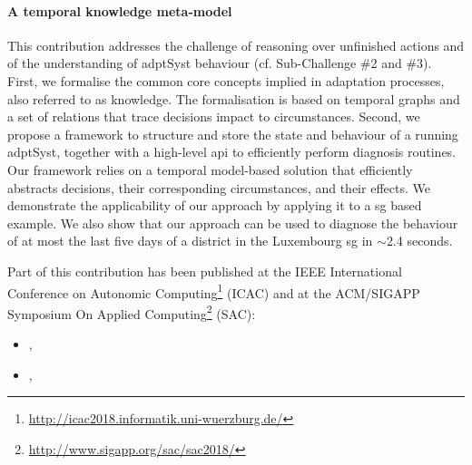 \paragraph{A temporal knowledge meta-model}
This contribution addresses the challenge of reasoning over unfinished actions and of the understanding of \gls{adptSyst} \gls{behaviour} (cf. Sub-Challenge \#2 and \#3).
First, we formalise the common core concepts implied in adaptation processes, also referred to as \gls{knowledge}.
The formalisation is based on temporal graphs and a set of relations that trace decisions impact to circumstances.
Second, we propose a framework to structure and store the state and behaviour of a running \gls{adptSyst}, together with a high-level \gls{api} to efficiently perform diagnosis routines.
Our framework relies on a temporal model-based solution that efficiently abstracts decisions, their corresponding circumstances, and their effects.
We demonstrate the applicability of our approach by applying it to a \gls{sg} based example.
We also show that our approach can be used to diagnose the behaviour of at most the last five days of a district in the Luxembourg \gls{sg} in $\sim$2.4 seconds.


Part of this contribution has been published at the IEEE International Conference on Autonomic Computing\footnote{\url{http://icac2018.informatik.uni-wuerzburg.de/}} (ICAC) and at the ACM/SIGAPP Symposium On Applied Computing\footnote{\url{http://www.sigapp.org/sac/sac2018/}} (SAC):
\begin{itemize}
	\item {}, \citeauthor{DBLP:conf/sac/MoulineB0FBMB18}
	\item {}, \citeauthor{DBLP:conf/icac/MoulineBFBB18}
\end{itemize}